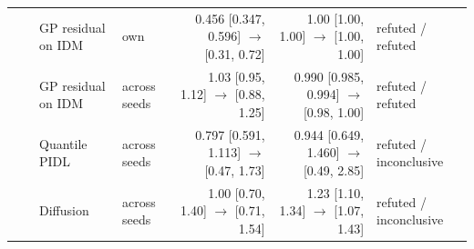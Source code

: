 \begin{longtable}{llllrrl}
 &  & GP residual on IDM & own & 0.456 [0.347, 0.596] $\rightarrow$ [0.31, 0.72] & 1.00 [1.00, 1.00] $\rightarrow$ [1.00, 1.00] & refuted / refuted \\
 &  & GP residual on IDM & across seeds & 1.03 [0.95, 1.12] $\rightarrow$ [0.88, 1.25] & 0.990 [0.985, 0.994] $\rightarrow$ [0.98, 1.00] & refuted / refuted \\
 &  & Quantile PIDL & across seeds & 0.797 [0.591, 1.113] $\rightarrow$ [0.47, 1.73] & 0.944 [0.649, 1.460] $\rightarrow$ [0.49, 2.85] & refuted / inconclusive \\
 &  & Diffusion & across seeds & 1.00 [0.70, 1.40] $\rightarrow$ [0.71, 1.54] & 1.23 [1.10, 1.34] $\rightarrow$ [1.07, 1.43] & refuted / inconclusive \\
\end{longtable}
\endgroup
